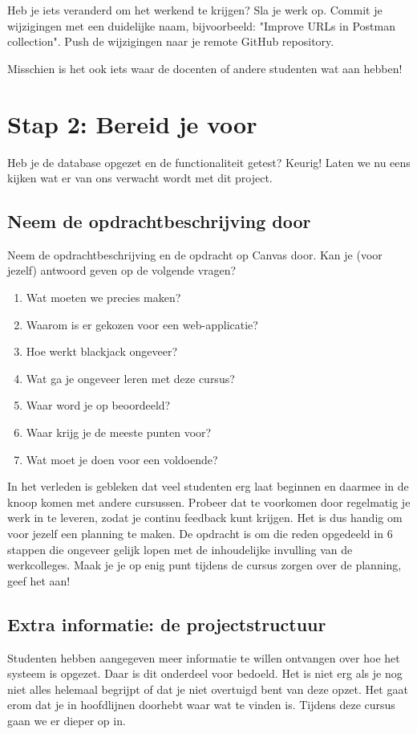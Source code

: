 Heb je iets veranderd om het werkend te krijgen? Sla je werk op. 
Commit je wijzigingen met een duidelijke naam, 
bijvoorbeeld: "Improve URLs in Postman collection". 
Push de wijzigingen naar je remote GitHub repository.

Misschien is het ook iets waar de docenten of andere studenten 
wat aan hebben!

\newpage
\section{Stap 2: Bereid je voor}
Heb je de database opgezet en de functionaliteit getest? Keurig!
Laten we nu eens kijken wat er van ons verwacht wordt met dit project.

\subsection{Neem de opdrachtbeschrijving door}
Neem de opdrachtbeschrijving en de opdracht op Canvas door. 
Kan je (voor jezelf) antwoord geven op de volgende vragen?

\begin{enumerate}
    \item Wat moeten we precies maken?
    \item Waarom is er gekozen voor een web-applicatie?
    \item Hoe werkt blackjack ongeveer?
    \item Wat ga je ongeveer leren met deze cursus?
    \item Waar word je op beoordeeld?
    \item Waar krijg je de meeste punten voor?
    \item Wat moet je doen voor een voldoende?
\end{enumerate}

In het verleden is gebleken dat veel studenten erg laat beginnen 
en daarmee in de knoop komen met andere cursussen. Probeer dat te 
voorkomen door regelmatig je werk in te leveren, zodat je continu feedback 
kunt krijgen. Het is dus handig om voor jezelf een planning te maken.
De opdracht is om die reden opgedeeld in 6 stappen die ongeveer gelijk lopen 
met de inhoudelijke invulling van de werkcolleges.
Maak je je op enig punt tijdens de cursus zorgen over de planning,
geef het aan!

\subsection{Extra informatie: de projectstructuur}
Studenten hebben aangegeven meer informatie te willen ontvangen over hoe het 
systeem is opgezet. Daar is dit onderdeel voor bedoeld. Het is niet 
erg als je nog niet alles helemaal begrijpt of dat je niet overtuigd 
bent van deze opzet. Het gaat erom dat je in hoofdlijnen doorhebt 
waar wat te vinden is. Tijdens deze cursus gaan we er dieper op in.


